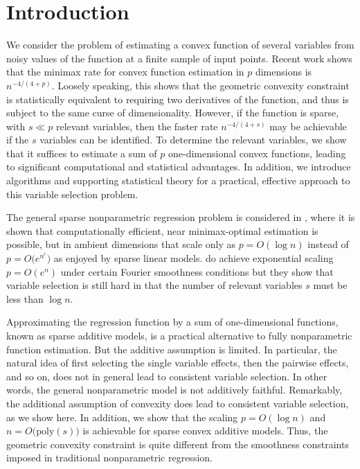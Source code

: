 \section{Introduction}


We consider the problem of estimating a convex function of several
variables from noisy values of the function at a finite sample of
input points.  Recent work \cite{Guntu:12,Guntu:13} shows that the
minimax rate for convex function estimation in $p$ dimensions is
$n^{-4/(4+p)}$.  Loosely speaking, this shows that the
geometric convexity constraint is statistically equivalent to
requiring two derivatives of the function, and thus is
subject to the same curse of dimensionality.
However, if the function is sparse, with $s\ll p$ relevant variables,
then the faster rate $n^{-4/(4+s)}$ may be achievable if the $s$
variables can be identified.  To determine the relevant variables, we
show that it suffices to estimate a sum of $p$ one-dimensional convex
functions, leading to significant computational and statistical
advantages.  In addition, we introduce algorithms and supporting
statistical theory for a practical, effective approach to this
variable selection problem.

The general sparse nonparametric regression problem is considered in \cite{lafferty2008rodeo}, where it is shown that computationally efficient, near minimax-optimal estimation is possible, but in ambient
dimensions that scale only as $p = O(\log n)$ instead of $p=O\bigl(e^{n^c}\bigr)$ as enjoyed by sparse linear models. \citet{dalalyan:12} do achieve exponential scaling $p=O(e^n)$ under certain Fourier smoothness conditions but they show that variable selection is still hard in that the number of relevant variables $s$ must be less than $\log n$.


Approximating the regression function by a sum of one-dimensional functions, known as sparse additive models, \cite{Ravikumar:09} is a practical alternative to fully
nonparametric function estimation.  But the additive assumption is
limited.  In particular, the natural idea of first selecting the
single variable effects, then the pairwise effects, and so on, does
not in general lead to consistent variable selection.  In other words,
the general nonparametric model is not additively faithful.
Remarkably, the additional assumption of convexity does lead to
consistent variable selection, as we show here. In addition, we show that
the scaling $p = O(\log n)$ and $n = O\big(\textrm{poly}(s)\big)$ is achievable for sparse convex additive models. Thus, the geometric convexity constraint is quite different from the
smoothness constraints imposed in traditional nonparametric
regression.

